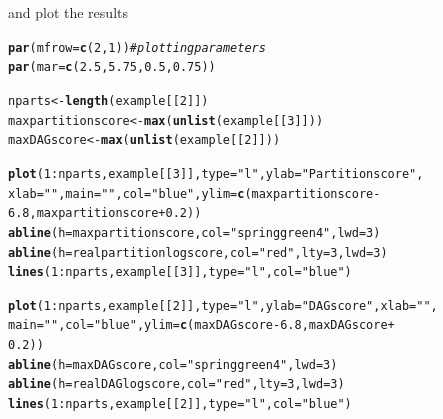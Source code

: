 \documentclass[a4paper]{article}\usepackage[]{graphicx}\usepackage[]{color}
\makeatletter
\newcommand{\hlnum}[1]{\textcolor[rgb]{0.686,0.059,0.569}{#1}}%
\newcommand{\hlstr}[1]{\textcolor[rgb]{0.192,0.494,0.8}{#1}}%
\newcommand{\hlcom}[1]{\textcolor[rgb]{0.678,0.584,0.686}{\textit{#1}}}%
\newcommand{\hlopt}[1]{\textcolor[rgb]{0,0,0}{#1}}%
\newcommand{\hlstd}[1]{\textcolor[rgb]{0.345,0.345,0.345}{#1}}%
\newcommand{\hlkwb}[1]{\textcolor[rgb]{0.69,0.353,0.396}{#1}}%
\newcommand{\hlkwc}[1]{\textcolor[rgb]{0.333,0.667,0.333}{#1}}%
\newcommand{\hlkwd}[1]{\textcolor[rgb]{0.737,0.353,0.396}{\textbf{#1}}}%
\newenvironment{kframe}{%
 \def\at@end@of@kframe{}%
 \ifinner\ifhmode%
  \def\at@end@of@kframe{\end{minipage}}%
  \begin{minipage}{\columnwidth}%
 \fi\fi%
 \def\FrameCommand##1{\hskip\@totalleftmargin \hskip-\fboxsep
 \colorbox{shadecolor}{##1}\hskip-\fboxsep
     \hskip-\linewidth \hskip-\@totalleftmargin \hskip\columnwidth}%
 \MakeFramed {\advance\hsize-\width
   \@totalleftmargin\z@ \linewidth\hsize
   \@setminipage}}%
 {\par\unskip\endMakeFramed%
 \at@end@of@kframe}
\newenvironment{knitrout}{}{} %
\newcommand{\nn}{\noindent}
\makeatother
\begin{document}
\nn and plot the results

\begin{knitrout}
\color{fgcolor}\begin{kframe}
\begin{alltt}
\hlkwd{par}\hlstd{(}\hlkwc{mfrow} \hlstd{=} \hlkwd{c}\hlstd{(}\hlnum{2}\hlstd{,} \hlnum{1}\hlstd{))}  \hlcom{# plotting parameters}
\hlkwd{par}\hlstd{(}\hlkwc{mar} \hlstd{=} \hlkwd{c}\hlstd{(}\hlnum{2.5}\hlstd{,} \hlnum{5.75}\hlstd{,} \hlnum{0.5}\hlstd{,} \hlnum{0.75}\hlstd{))}

\hlstd{nparts} \hlkwb{<-} \hlkwd{length}\hlstd{(example[[}\hlnum{2}\hlstd{]])}
\hlstd{maxpartitionscore} \hlkwb{<-} \hlkwd{max}\hlstd{(}\hlkwd{unlist}\hlstd{(example[[}\hlnum{3}\hlstd{]]))}
\hlstd{maxDAGscore} \hlkwb{<-} \hlkwd{max}\hlstd{(}\hlkwd{unlist}\hlstd{(example[[}\hlnum{2}\hlstd{]]))}

\hlkwd{plot}\hlstd{(}\hlnum{1}\hlopt{:}\hlstd{nparts, example[[}\hlnum{3}\hlstd{]],} \hlkwc{type} \hlstd{=} \hlstr{"l"}\hlstd{,} \hlkwc{ylab} \hlstd{=} \hlstr{"Partition score"}\hlstd{,}
    \hlkwc{xlab} \hlstd{=} \hlstr{""}\hlstd{,} \hlkwc{main} \hlstd{=} \hlstr{""}\hlstd{,} \hlkwc{col} \hlstd{=} \hlstr{"blue"}\hlstd{,} \hlkwc{ylim} \hlstd{=} \hlkwd{c}\hlstd{(maxpartitionscore} \hlopt{-}
        \hlnum{6.8}\hlstd{, maxpartitionscore} \hlopt{+} \hlnum{0.2}\hlstd{))}
\hlkwd{abline}\hlstd{(}\hlkwc{h} \hlstd{= maxpartitionscore,} \hlkwc{col} \hlstd{=} \hlstr{"springgreen4"}\hlstd{,} \hlkwc{lwd} \hlstd{=} \hlnum{3}\hlstd{)}
\hlkwd{abline}\hlstd{(}\hlkwc{h} \hlstd{= realpartitionlogscore,} \hlkwc{col} \hlstd{=} \hlstr{"red"}\hlstd{,} \hlkwc{lty} \hlstd{=} \hlnum{3}\hlstd{,} \hlkwc{lwd} \hlstd{=} \hlnum{3}\hlstd{)}
\hlkwd{lines}\hlstd{(}\hlnum{1}\hlopt{:}\hlstd{nparts, example[[}\hlnum{3}\hlstd{]],} \hlkwc{type} \hlstd{=} \hlstr{"l"}\hlstd{,} \hlkwc{col} \hlstd{=} \hlstr{"blue"}\hlstd{)}

\hlkwd{plot}\hlstd{(}\hlnum{1}\hlopt{:}\hlstd{nparts, example[[}\hlnum{2}\hlstd{]],} \hlkwc{type} \hlstd{=} \hlstr{"l"}\hlstd{,} \hlkwc{ylab} \hlstd{=} \hlstr{"DAG score"}\hlstd{,} \hlkwc{xlab} \hlstd{=} \hlstr{""}\hlstd{,}
    \hlkwc{main} \hlstd{=} \hlstr{""}\hlstd{,} \hlkwc{col} \hlstd{=} \hlstr{"blue"}\hlstd{,} \hlkwc{ylim} \hlstd{=} \hlkwd{c}\hlstd{(maxDAGscore} \hlopt{-} \hlnum{6.8}\hlstd{, maxDAGscore} \hlopt{+}
        \hlnum{0.2}\hlstd{))}
\hlkwd{abline}\hlstd{(}\hlkwc{h} \hlstd{= maxDAGscore,} \hlkwc{col} \hlstd{=} \hlstr{"springgreen4"}\hlstd{,} \hlkwc{lwd} \hlstd{=} \hlnum{3}\hlstd{)}
\hlkwd{abline}\hlstd{(}\hlkwc{h} \hlstd{= realDAGlogscore,} \hlkwc{col} \hlstd{=} \hlstr{"red"}\hlstd{,} \hlkwc{lty} \hlstd{=} \hlnum{3}\hlstd{,} \hlkwc{lwd} \hlstd{=} \hlnum{3}\hlstd{)}
\hlkwd{lines}\hlstd{(}\hlnum{1}\hlopt{:}\hlstd{nparts, example[[}\hlnum{2}\hlstd{]],} \hlkwc{type} \hlstd{=} \hlstr{"l"}\hlstd{,} \hlkwc{col} \hlstd{=} \hlstr{"blue"}\hlstd{)}
\end{alltt}
\end{kframe}


\end{knitrout}
\end{document}
